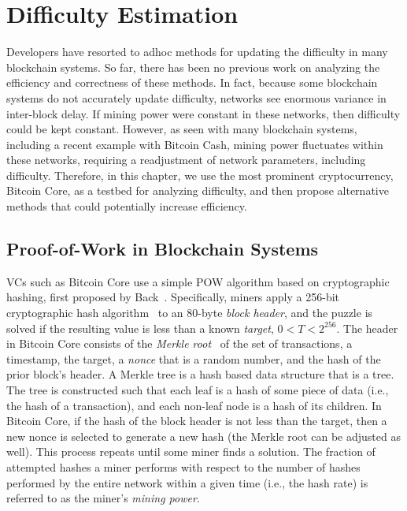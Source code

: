 \chapter{Difficulty Estimation}
\label{difficulty-estimation}

Developers have resorted to adhoc methods for updating the difficulty in many blockchain systems. So far, there has been no previous work on analyzing the efficiency and correctness of these methods. In fact, because some blockchain systems do not accurately update difficulty, networks see enormous variance in inter-block delay. If mining power were constant in these networks, then difficulty could be kept constant. However, as seen with many blockchain systems, including a recent example with Bitcoin Cash, mining power fluctuates within these networks, requiring a readjustment of network parameters, including difficulty. Therefore, in this chapter, we use the most prominent cryptocurrency, Bitcoin Core, as a testbed for analyzing difficulty, and then propose alternative methods that could potentially increase efficiency. 

\section{Proof-of-Work in Blockchain Systems}
VCs such as Bitcoin Core use a simple POW algorithm based on cryptographic
hashing, first proposed by Back~\cite{Back:2002}.
Specifically, miners apply a 256-bit cryptographic hash algorithm~\cite{hashcash} to
an 80-byte {\em block header}, and the puzzle is solved if the
resulting value is less than a known {\em target}, $0<T<2^{256}$. The
header in Bitcoin Core consists of the {\em Merkle root}~\cite{Merkle:1987} of the set of
transactions, a timestamp, the target, a {\em
  nonce} that is a random number, and the hash of the prior block's header. A Merkle tree is a hash based data structure that is a tree. The tree is constructed such that each leaf is a hash of some piece of data (i.e., the hash of a transaction), and each non-leaf node is a hash of its children.
In Bitcoin Core, if the hash of the block header is not less than the target, then a new nonce is selected to generate a new hash (the Merkle root can be adjusted as well). This process repeats
until some miner finds a solution. The fraction of attempted hashes a miner performs with respect to the number of hashes performed by the entire network within a given time (i.e., the hash rate) is referred to as the miner's {\em mining power}.
  
